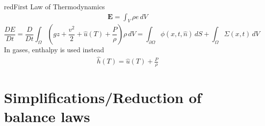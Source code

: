 \documentclass[a4paper, 11pt,article,oneside]{memoir}%
\begin{document}
\begin{eqbox2}{red}{First Law of Thermodynamics}
\begin{align*}
\boldsymbol{E}=\int_V \rho e \,dV
\end{align*}
\begin{equation*}
\frac{DE}{Dt}=\frac{D}{Dt}\int_\Omega \left(gz+\frac{v^2}{2}+\hat{u}(T)+\frac{P}{\rho}\right)\rho\, dV=\int_{\partial \Omega}\phi(x,t,\hat{n})\,dS +\int_\Omega \Sigma(x,t) \,dV
\end{equation*}
\vspace{0.2cm}
In gases, enthalpy is used instead 
\begin{align*}
\hat{h}(T)=\hat{u}(T)+\frac{P}{\rho}
\end{align*}
\end{eqbox2}

\newpage
\section{Simplifications/Reduction of balance laws}
\end{document}
